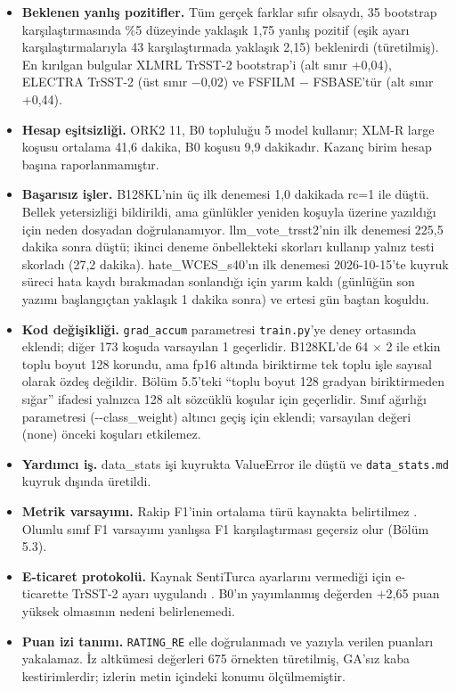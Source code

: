 \documentclass[11pt]{article}
\begin{document}
\begin{itemize}
\item \textbf{Beklenen yanlış pozitifler.} Tüm gerçek farklar sıfır olsaydı, 35 bootstrap karşılaştırmasında \%5 düzeyinde yaklaşık 1,75 yanlış pozitif (eşik ayarı karşılaştırmalarıyla 43 karşılaştırmada yaklaşık 2,15) beklenirdi (türetilmiş). En kırılgan bulgular XLMRL TrSST-2 bootstrap'i (alt sınır +0,04), ELECTRA TrSST-2 (üst sınır $-$0,02) ve FSFILM $-$ FSBASE'tür (alt sınır +0,44).
\item \textbf{Hesap eşitsizliği.} ORK2 11, B0 topluluğu 5 model kullanır; XLM-R large koşusu ortalama 41,6 dakika, B0 koşusu 9,9 dakikadır. Kazanç birim hesap başına raporlanmamıştır.
\item \textbf{Başarısız işler.} B128KL'nin üç ilk denemesi 1,0 dakikada rc=1 ile düştü. Bellek yetersizliği bildirildi, ama günlükler yeniden koşuyla üzerine yazıldığı için neden dosyadan doğrulanamıyor. llm\_vote\_trsst2'nin ilk denemesi 225,5 dakika sonra düştü; ikinci deneme önbellekteki skorları kullanıp yalnız testi skorladı (27,2 dakika). hate\_WCES\_s40'ın ilk denemesi 2026-10-15'te kuyruk süreci hata kaydı bırakmadan sonlandığı için yarım kaldı (günlüğün son yazımı başlangıçtan yaklaşık 1 dakika sonra) ve ertesi gün baştan koşuldu.
\item \textbf{Kod değişikliği.} \texttt{grad\_\allowbreak{}\allowbreak{}accum} parametresi \texttt{train.\allowbreak{}\allowbreak{}py}'ye deney ortasında eklendi; diğer 173 koşuda varsayılan 1 geçerlidir. B128KL'de 64 $\times$ 2 ile etkin toplu boyut 128 korundu, ama fp16 altında biriktirme tek toplu işle sayısal olarak özdeş değildir. Bölüm 5.5'teki ``toplu boyut 128 gradyan biriktirmeden sığar'' ifadesi yalnızca 128 alt sözcüklü koşular için geçerlidir. Sınıf ağırlığı parametresi (-{}-class\_weight) altıncı geçiş için eklendi; varsayılan değeri (none) önceki koşuları etkilemez.
\item \textbf{Yardımcı iş.} data\_stats işi kuyrukta ValueError ile düştü ve \texttt{data\_\allowbreak{}\allowbreak{}stats.\allowbreak{}\allowbreak{}md} kuyruk dışında üretildi.
\item \textbf{Metrik varsayımı.} Rakip F1'inin ortalama türü kaynakta belirtilmez \citep{altinok2025}. Olumlu sınıf F1 varsayımı yanlışsa F1 karşılaştırması geçersiz olur (Bölüm 5.3).
\item \textbf{E-ticaret protokolü.} Kaynak SentiTurca ayarlarını vermediği için e-ticarette TrSST-2 ayarı uygulandı \citep{altinok2025}. B0'ın yayımlanmış değerden +2,65 puan yüksek olmasının nedeni belirlenemedi.
\item \textbf{Puan izi tanımı.} \texttt{RATING\_\allowbreak{}\allowbreak{}RE} elle doğrulanmadı ve yazıyla verilen puanları yakalamaz. İz altkümesi değerleri 675 örnekten türetilmiş, GA'sız kaba kestirimlerdir; izlerin metin içindeki konumu ölçülmemiştir.

\end{itemize}
\end{document}
